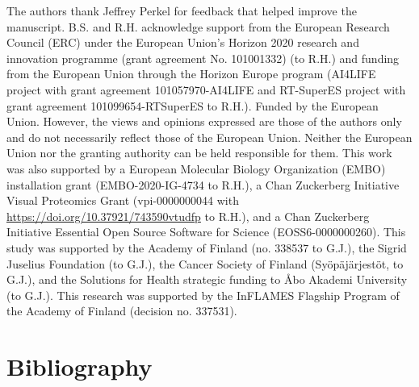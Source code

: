\documentclass[times, twoside]{rxiv_maker_style}
\begin{document}
\begin{acknowledgements}
The authors thank Jeffrey Perkel for feedback that helped improve the manuscript. B.S. and R.H. acknowledge support from the European Research Council (ERC) under the European Union's Horizon 2020 research and innovation programme (grant agreement No. 101001332) (to R.H.) and funding from the European Union through the Horizon Europe program (AI4LIFE project with grant agreement 101057970-AI4LIFE and RT-SuperES project with grant agreement 101099654-RTSuperES to R.H.). Funded by the European Union. However, the views and opinions expressed are those of the authors only and do not necessarily reflect those of the European Union. Neither the European Union nor the granting authority can be held responsible for them. This work was also supported by a European Molecular Biology Organization (EMBO) installation grant (EMBO-2020-IG-4734 to R.H.), a Chan Zuckerberg Initiative Visual Proteomics Grant (vpi-0000000044 with \url{https://doi.org/10.37921/743590vtudfp} to R.H.), and a Chan Zuckerberg Initiative Essential Open Source Software for Science (EOSS6-0000000260). This study was supported by the Academy of Finland (no. 338537 to G.J.), the Sigrid Juselius Foundation (to G.J.), the Cancer Society of Finland (Syöpäjärjestöt, to G.J.), and the Solutions for Health strategic funding to Åbo Akademi University (to G.J.). This research was supported by the InFLAMES Flagship Program of the Academy of Finland (decision no. 337531).
\end{acknowledgements}

\begin{exauthor}
\begin{extendedauthorlist}
\end{extendedauthorlist}
\end{exauthor}

\section*{Bibliography}

\end{document}
